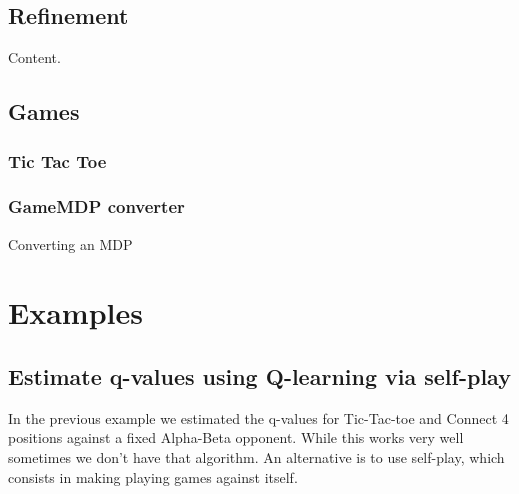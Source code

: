 \documentclass{article}
\newcommand{\GithubURL}[1]{[\href{https://github.com/davidrobles/mlnd-capstone-code/blob/master/#1}{source}]}
\begin{document}
\pagebreak[4]


\subsection{Refinement}

Content.

\subsection{Games}

\subsubsection{Tic Tac Toe}


\subsubsection{GameMDP converter}

Converting an MDP

\section{Examples}



\subsection{Estimate q-values using Q-learning via self-play}

In the previous example we estimated the q-values for Tic-Tac-toe and Connect 4 positions against a
fixed Alpha-Beta opponent. While this works very well sometimes we don't have that algorithm. An
alternative is to use self-play, which consists in making playing games against itself.

\end{document}
